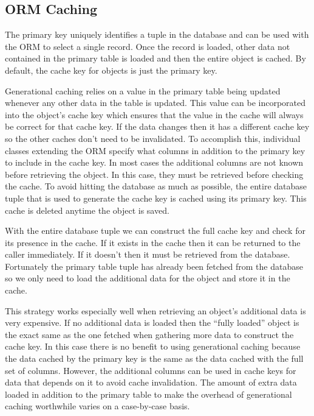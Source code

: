\documentclass[12pt]{ucthesis}
\begin{document}
\subsection{ORM Caching}
The primary key uniquely identifies a tuple in the database and can be used with the ORM to select a single record.
Once the record is loaded, other data not contained in the primary table is loaded and then the entire object is cached.
By default, the cache key for objects is just the primary key.

Generational caching relies on a value in the primary table being updated whenever any other data in the table is updated.
This value can be incorporated into the object's cache key which ensures that the value in the cache will always be correct for that cache key.
If the data changes then it has a different cache key so the other caches don't need to be invalidated.
To accomplish this, individual classes extending the ORM specify what columns in addition to the primary key to include in the cache key.
In most cases the additional columns are not known before retrieving the object.
In this case, they must be retrieved before checking the cache.
To avoid hitting the database as much as possible, the entire database tuple that is used to generate the cache key is cached using its primary key.
This cache is deleted anytime the object is saved.

With the entire database tuple we can construct the full cache key and check for its presence in the cache.
If it exists in the cache then it can be returned to the caller immediately.
If it doesn't then it must be retrieved from the database.
Fortunately the primary table tuple has already been fetched from the database so we only need to load the additional data for the object and store it in the cache.

This strategy works especially well when retrieving an object's additional data is very expensive.
If no additional data is loaded then the ``fully loaded'' object is the exact same as the one fetched when gathering more data to construct the cache key.
In this case there is no benefit to using generational caching because the data cached by the primary key is the same as the data cached with the full set of columns.
However, the additional columns can be used in cache keys for data that depends on it to avoid cache invalidation.
The amount of extra data loaded in addition to the primary table to make the overhead of generational caching worthwhile varies on a case-by-case basis.
\end{document}
